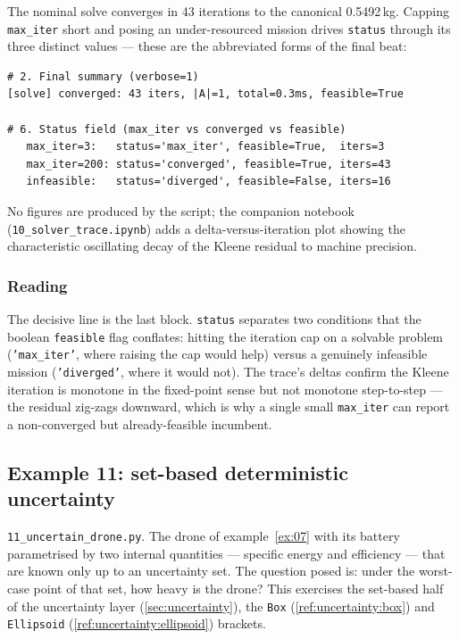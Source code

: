 \documentclass[11pt,a4paper]{article}
\begin{document}
The nominal solve converges in 43 iterations to the canonical
0.5492\,kg. Capping \texttt{max\_iter} short and posing an
under-resourced mission drives \texttt{status} through its three
distinct values --- these are the abbreviated forms of the final beat:

\begin{lstlisting}[language={},numbers=none,keywordstyle={}]
# 2. Final summary (verbose=1)
[solve] converged: 43 iters, |A|=1, total=0.3ms, feasible=True

# 6. Status field (max_iter vs converged vs feasible)
   max_iter=3:   status='max_iter', feasible=True,  iters=3
   max_iter=200: status='converged', feasible=True, iters=43
   infeasible:   status='diverged', feasible=False, iters=16
\end{lstlisting}

No figures are produced by the script; the companion notebook
(\texttt{10\_solver\_trace.ipynb}) adds a delta-versus-iteration plot
showing the characteristic oscillating decay of the Kleene residual to
machine precision.

\subsubsection*{Reading}

The decisive line is the last block. \texttt{status} separates two
conditions that the boolean \texttt{feasible} flag conflates: hitting
the iteration cap on a solvable problem (\texttt{'max\_iter'}, where
raising the cap would help) versus a genuinely infeasible mission
(\texttt{'diverged'}, where it would not). The trace's deltas confirm
the Kleene iteration is monotone in the fixed-point sense but not
monotone step-to-step --- the residual zig-zags downward, which is why
a single small \texttt{max\_iter} can report a non-converged but
already-feasible incumbent.

\subsection{Example 11: set-based deterministic uncertainty}
\label{ex:11}

\texttt{11\_uncertain\_drone.py}. The drone of example~\ref{ex:07} with
its battery parametrised by two internal quantities --- specific energy
and efficiency --- that are known only up to an uncertainty set. The
question posed is: under the worst-case point of that set, how heavy is
the drone? This exercises the set-based half of the uncertainty layer
(\ref{sec:uncertainty}), the \texttt{Box}
(\ref{ref:uncertainty:box}) and \texttt{Ellipsoid}
(\ref{ref:uncertainty:ellipsoid}) brackets.
\end{document}
